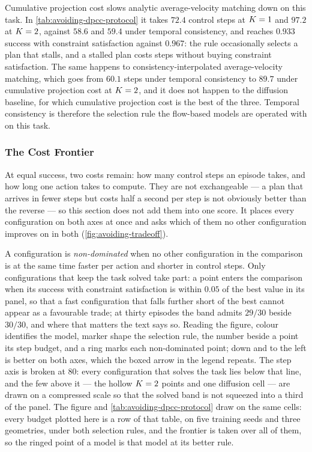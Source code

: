 Cumulative projection cost slows analytic average-velocity matching down on this task. In
\autoref{tab:avoiding-dpcc-protocol} it takes $72.4$ control steps at $K=1$ and $97.2$ at $K=2$,
against $58.6$ and $59.4$ under temporal consistency, and reaches $0.933$ success with constraint
satisfaction against $0.967$: the rule occasionally selects a plan that stalls, and a stalled plan costs
steps without buying constraint satisfaction. The same happens to consistency-interpolated
average-velocity matching, which goes from $60.1$ steps under temporal consistency to $89.7$ under
cumulative projection cost at $K=2$, and it does not happen to the diffusion baseline, for which
cumulative projection cost is the best of the three. Temporal consistency is therefore the selection rule
the flow-based models are operated with on this task.

\subsubsection{The Cost Frontier}\label{sec:res:avoiding:pareto}

At equal success, two costs remain: how many control steps an episode takes, and how long one action takes
to compute. They are not exchangeable --- a plan that arrives in fewer steps but costs half a second per
step is not obviously better than the reverse --- so this section does not add them into one score. It
places every configuration on both axes at once and asks which of them no other configuration improves on in both
(\autoref{fig:avoiding-tradeoff}).

A configuration is \emph{non-dominated} when no other configuration in the comparison is at the same time
faster per action and shorter in control steps. Only configurations that keep the task solved take part:
a point enters the comparison when its success with constraint satisfaction is within $0.05$ of the best
value in its panel, so that a fast configuration that falls further short of the best cannot appear as a
favourable trade; at thirty episodes the band admits $29/30$ beside $30/30$, and where that matters the text
says so. Reading the figure, colour identifies the model, marker shape the selection rule, the
number beside a point its step budget, and a ring marks each non-dominated point; down and to the left is
better on both axes, which the boxed arrow in the legend repeats. The step axis is broken at $80$: every
configuration that solves the task lies below that line, and the few above it --- the hollow $K=2$
points and one diffusion cell --- are drawn on a compressed scale so that the solved band is not squeezed
into a third of the panel. The figure and
\autoref{tab:avoiding-dpcc-protocol} draw on the same cells: every budget plotted here is a row of that
table, on five training seeds and three geometries, under both selection rules, and the frontier is taken
over all of them, so the ringed point of a model is that model at its better rule.

